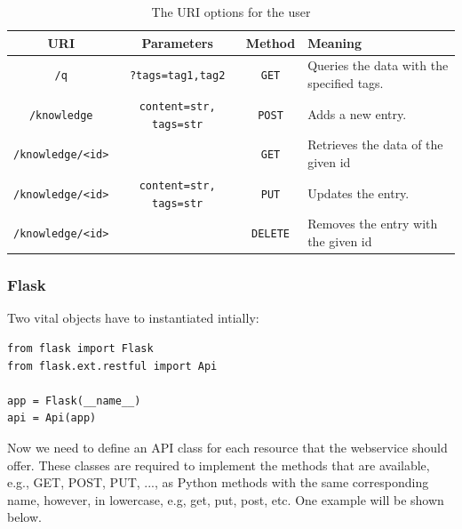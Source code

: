 \documentclass[11pt, a4paper]{article}
\begin{document}
\begin{table}[htbp]
  \centering
  \begin{tabular}{| c | c | c | l | } \hline
    \textbf{URI} & \textbf{Parameters} & \textbf{Method} & \textbf{Meaning} \\ \hline
    \lstinline|/q| & \lstinline|?tags=tag1,tag2| & \lstinline|GET| & Queries the data with the specified tags.  \\ \hline
    \lstinline|/knowledge| & \lstinline|content=str, tags=str| & \lstinline|POST| & Adds a new entry. \\ \hline
    \lstinline|/knowledge/<id>| &  & \lstinline|GET| & Retrieves the data of the given id  \\ \hline
    \lstinline|/knowledge/<id>| & \lstinline|content=str, tags=str| & \lstinline|PUT| & Updates the entry.   \\ \hline
    \lstinline|/knowledge/<id>| &  & \lstinline|DELETE| & Removes the entry with the given id \\ \hline
  \end{tabular}
  \caption{The URI options for the user}
  \label{tab:uri}
\end{table}

\subsubsection{Flask}

Two vital objects have to instantiated intially: 

\begin{lstlisting}
from flask import Flask
from flask.ext.restful import Api

app = Flask(__name__)
api = Api(app)
\end{lstlisting}
\vspace{10pt}

Now we need to define an API class for each resource that the webservice should
offer. These classes are required to implement the methods that are available,
e.g., GET, POST, PUT, ..., as Python methods with the same corresponding name,
however, in lowercase, e.g, get, put, post, etc. One example will be shown
below. 
\end{document}
